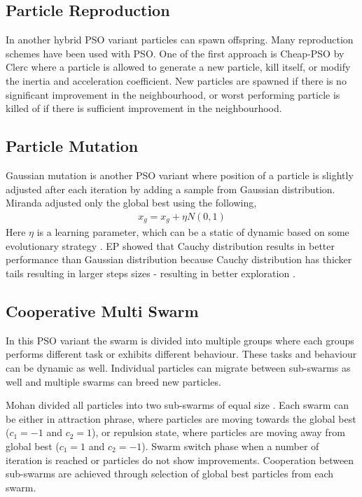 \documentclass{article}
\begin{document}
\subsection{Particle Reproduction}
In another hybrid PSO variant particles can spawn offspring. Many reproduction schemes have been used with PSO. One of the first approach is Cheap-PSO by Clerc \cite{clerc1999swarm} where a particle is allowed to generate a new particle, kill itself, or modify the inertia and acceleration coefficient. New particles are spawned if there is no significant improvement in the neighbourhood, or worst performing particle is killed of if there is sufficient improvement in the neighbourhood.

\subsection{Particle Mutation}
Gaussian mutation is another PSO variant where position of a particle is slightly adjusted after each iteration by adding a sample from Gaussian distribution. Miranda adjusted only the global best using the following,
\begin{align*}
    x_g  = x_g + \eta N(0, 1)
\end{align*}
Here $\eta$ is a learning parameter, which can be a static of dynamic based on some evolutionary strategy \cite{miranda2002epso}. EP showed that Cauchy distribution results in better performance than Gaussian distribution because Cauchy distribution has thicker tails resulting in larger steps sizes - resulting in better exploration \cite{yao1996fast}.

\subsection{Cooperative Multi Swarm}
In this PSO variant the swarm is divided into multiple groups where each groups performs different task or exhibits different behaviour. These tasks and behaviour can be dynamic as well. Individual particles can migrate between sub-swarms as well and multiple swarms can breed new particles.


Mohan divided all particles into two sub-swarms of equal size  \cite{al2002multi}. Each swarm can be either in attraction phrase, where particles are moving towards the global best ($c_1 = -1$ and $c_2 = 1$), or repulsion state, where particles are moving away from global best ($c_1 = 1$ and $c_2 = -1$). Swarm switch phase when a number of iteration is reached or particles do not show improvements. Cooperation between sub-swarms are achieved through selection of global best particles from each swarm.
\end{document}
